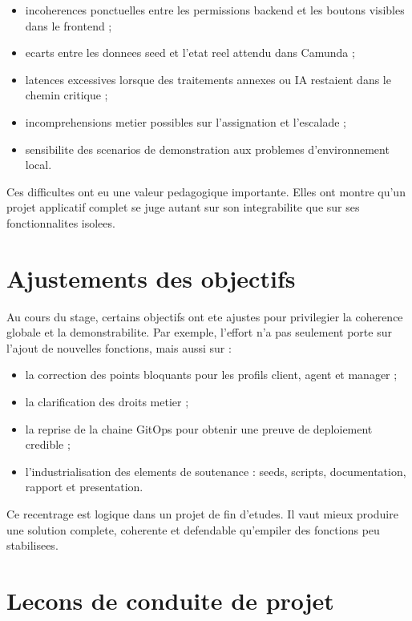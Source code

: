 \begin{itemize}[leftmargin=1.2cm]
  \item incoherences ponctuelles entre les permissions backend et les boutons visibles dans le frontend ;
  \item ecarts entre les donnees seed et l'etat reel attendu dans Camunda ;
  \item latences excessives lorsque des traitements annexes ou IA restaient dans le chemin critique ;
  \item incomprehensions metier possibles sur l'assignation et l'escalade ;
  \item sensibilite des scenarios de demonstration aux problemes d'environnement local.
\end{itemize}

Ces difficultes ont eu une valeur pedagogique importante. Elles ont montre qu'un projet applicatif complet se juge autant sur son integrabilite que sur ses fonctionnalites isolees.

\section{Ajustements des objectifs}

Au cours du stage, certains objectifs ont ete ajustes pour privilegier la coherence globale et la demonstrabilite. Par exemple, l'effort n'a pas seulement porte sur l'ajout de nouvelles fonctions, mais aussi sur :

\begin{itemize}[leftmargin=1.2cm]
  \item la correction des points bloquants pour les profils client, agent et manager ;
  \item la clarification des droits metier ;
  \item la reprise de la chaine GitOps pour obtenir une preuve de deploiement credible ;
  \item l'industrialisation des elements de soutenance : seeds, scripts, documentation, rapport et presentation.
\end{itemize}

Ce recentrage est logique dans un projet de fin d'etudes. Il vaut mieux produire une solution complete, coherente et defendable qu'empiler des fonctions peu stabilisees.

\section{Lecons de conduite de projet}

